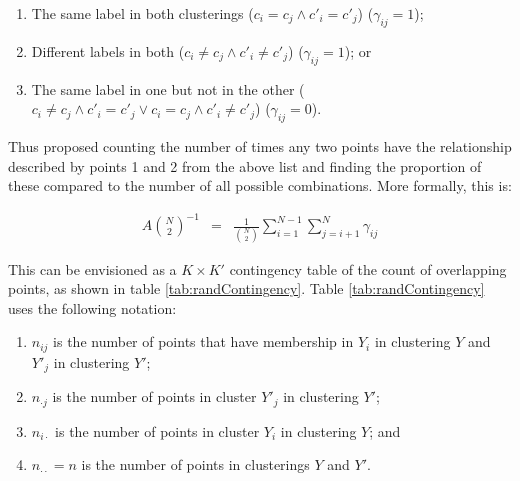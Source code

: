 \documentclass[
]{book}
\providecommand{\tightlist}{%
  \setlength{\itemsep}{0pt}\setlength{\parskip}{0pt}}
\begin{document}
\begin{enumerate}
\def\labelenumi{\arabic{enumi}.}
\tightlist
\item
  The same label in both clusterings (\(c_i = c_j \land c'_i = c'_j\)) (\(\gamma_{ij}=1\));
\item
  Different labels in both (\(c_i \neq c_j \land c'_i \neq c'_j\)) (\(\gamma_{ij}=1\)); or
\item
  The same label in one but not in the other (\(c_i \neq c_j \land c'_i = c'_j \lor c_i = c_j \land c'_i \neq c'_j\)) (\(\gamma_{ij}=0\)).
\end{enumerate}

Thus \citet{rand1971objective} proposed counting the number of times any two points have the relationship described by points 1 and 2 from the above list and finding the proportion of these compared to the number of all possible combinations. More formally, this is:

\begin{eqnarray}
A \binom{N}{2}^{-1} & = & \frac{1}{\binom{N}{2}} \sum_{i=1}^{N-1}\sum_{j=i + 1}^N\gamma_{ij}
\label{eq:randIndex}
\end{eqnarray}

This can be envisioned as a \(K \times K'\) contingency table of the count of overlapping points, as shown in table \ref{tab:randContingency}. Table \ref{tab:randContingency} uses the following notation:

\begin{enumerate}
\def\labelenumi{\arabic{enumi}.}
\tightlist
\item
  \(n_{ij}\) is the number of points that have membership in \(Y_i\) in clustering \(Y\) and \(Y'_j\) in clustering \(Y'\);
\item
  \(n_{\cdot j}\) is the number of points in cluster \(Y'_j\) in clustering \(Y'\);
\item
  \(n_{i \cdot}\) is the number of points in cluster \(Y_i\) in clustering \(Y\); and
\item
  \(n_{\cdot \cdot} = n\) is the number of points in clusterings \(Y\) and \(Y'\).
\end{enumerate}
\end{document}
